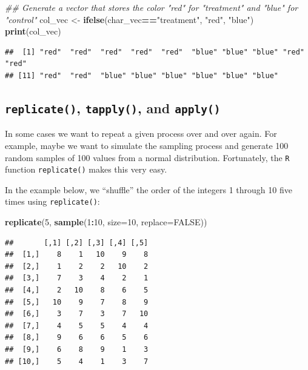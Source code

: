 \documentclass[]{book}
\newenvironment{Shaded}{\begin{snugshade}}{\end{snugshade}}
\newcommand{\CommentTok}[1]{\textcolor[rgb]{0.56,0.35,0.01}{\textit{#1}}}
\newcommand{\DataTypeTok}[1]{\textcolor[rgb]{0.13,0.29,0.53}{#1}}
\newcommand{\DecValTok}[1]{\textcolor[rgb]{0.00,0.00,0.81}{#1}}
\newcommand{\KeywordTok}[1]{\textcolor[rgb]{0.13,0.29,0.53}{\textbf{#1}}}
\newcommand{\NormalTok}[1]{#1}
\newcommand{\OperatorTok}[1]{\textcolor[rgb]{0.81,0.36,0.00}{\textbf{#1}}}
\newcommand{\OtherTok}[1]{\textcolor[rgb]{0.56,0.35,0.01}{#1}}
\newcommand{\StringTok}[1]{\textcolor[rgb]{0.31,0.60,0.02}{#1}}
\begin{document}
\begin{Shaded}
\begin{Highlighting}[]
\CommentTok{## Generate a vector that stores the color "red" for "treatment" and "blue" for "control"}
\NormalTok{col_vec <-}\StringTok{ }\KeywordTok{ifelse}\NormalTok{(char_vec}\OperatorTok{==}\StringTok{"treatment"}\NormalTok{, }\StringTok{"red"}\NormalTok{, }\StringTok{"blue"}\NormalTok{)}
\KeywordTok{print}\NormalTok{(col_vec)}
\end{Highlighting}
\end{Shaded}

\begin{verbatim}
##  [1] "red"  "red"  "red"  "red"  "red"  "blue" "blue" "blue" "red"  "red" 
## [11] "red"  "red"  "blue" "blue" "blue" "blue" "blue" "blue"
\end{verbatim}

\hypertarget{replicate-tapply-and-apply}{%
\subsection{\texorpdfstring{\texttt{replicate()}, \texttt{tapply()}, and \texttt{apply()}}{replicate(), tapply(), and apply()}}\label{replicate-tapply-and-apply}}

In some cases we want to repeat a given process over and over again. For example, maybe we want to simulate the sampling process and generate 100 random samples of 100 values from a normal distribution. Fortunately, the \texttt{R} function \texttt{replicate()} makes this very easy.

In the example below, we ``shuffle'' the order of the integers 1 through 10 five times using \texttt{replicate()}:

\begin{Shaded}
\begin{Highlighting}[]
\KeywordTok{replicate}\NormalTok{(}\DecValTok{5}\NormalTok{, }\KeywordTok{sample}\NormalTok{(}\DecValTok{1}\OperatorTok{:}\DecValTok{10}\NormalTok{, }\DataTypeTok{size=}\DecValTok{10}\NormalTok{, }\DataTypeTok{replace=}\OtherTok{FALSE}\NormalTok{))}
\end{Highlighting}
\end{Shaded}

\begin{verbatim}
##       [,1] [,2] [,3] [,4] [,5]
##  [1,]    8    1   10    9    8
##  [2,]    1    2    2   10    2
##  [3,]    7    3    4    2    1
##  [4,]    2   10    8    6    5
##  [5,]   10    9    7    8    9
##  [6,]    3    7    3    7   10
##  [7,]    4    5    5    4    4
##  [8,]    9    6    6    5    6
##  [9,]    6    8    9    1    3
## [10,]    5    4    1    3    7
\end{verbatim}
\end{document}
